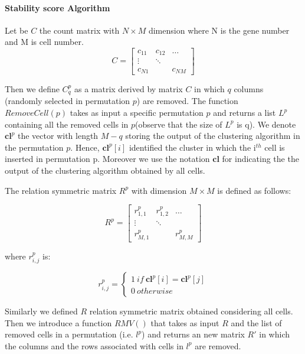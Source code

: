 \documentclass[12pt]{article}
\begin{document}
\setcounter{page}{35}



\paragraph{Stability score Algorithm}
Let be $C$ the count matrix with $N \times M $ dimension where N is the gene number and M is cell number.
\[
C = \begin{bmatrix} 
    c_{11} & c_{12} & \dots \\
    \vdots & \ddots & \\
    c_{N1} &        & c_{NM} 
    \end{bmatrix}
\]

Then we define $C^p_q$ as a matrix derived by matrix $C$ in which $q$ columns (randomly selected in permutation $p$) are removed.
The function $RemoveCell(p)$ takes as input a specific permutation $p$ and returns a list $L^p$ containing all the removed cells in $p$(observe that the size of $L^p$ is q).
We denote  $\textbf{cl}^p$ the vector with length $M-q$ storing the output of the clustering algorithm in the permutation $p$. Hence, $\textbf{cl}^p[i]$ identified the cluster in which the i$^{th}$ cell is inserted in permutation p.
Moreover we use the notation  $\textbf{cl}$ for indicating the  the output of the clustering algorithm obtained by all cells.


The relation symmetric matrix $R^p$  with dimension $M \times M$ is defined as follows: 

\[
R^p = \begin{bmatrix} 
    r^p_{1,1} & r^p_{1,2} & \dots \\
    \vdots & \ddots & \\
    r^p_{M,1} &        & r^p_{M,M} 
    \end{bmatrix}
\]

where $r^p_{i,j}$ is:

 \[
   r^p_{i,j}=\left\{
                \begin{array}{ll}
                 1 \ if \ \textbf{cl}^p[i]=\textbf{cl}^p[j]\\
                 0 \ otherwise 
                \end{array}
              \right.
  \]
  
Similarly we defined  $R$   relation symmetric matrix obtained considering  all  cells.
Then we introduce a function $RMV()$ that takes as input $R$ and the list of removed cells in   a permutation (i.e. $l^p$) and returns an new matrix $R'$ in which the columns and the rows associated with cells in  $l^p$ are removed.
\end{document}
